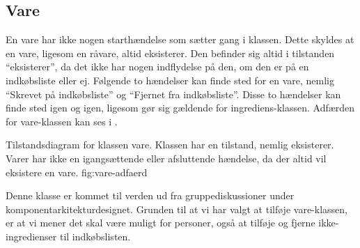\subsection{Vare}
En vare har ikke nogen starthændelse som sætter gang i klassen. Dette skyldes at en vare, ligesom en råvare, altid eksisterer. Den befinder sig altid i tilstanden ``eksisterer'', da det ikke har nogen indflydelse på den, om den er på en indkøbsliste eller ej. Følgende to hændelser kan finde sted for en vare, nemlig ``Skrevet på indkøbsliste'' og ``Fjernet fra indkøbsliste''. Disse to hændelser kan finde sted igen og igen, ligesom gør sig gældende for ingrediens-klassen. Adfærden for vare-klassen kan ses i . 

  {Tilstandsdiagram for klassen vare. Klassen har en tilstand, nemlig eksisterer. Varer har ikke en igangsættende eller afsluttende hændelse, da der altid vil eksistere en vare.}
  {fig:vare-adfaerd}
  
Denne klasse er kommet til verden ud fra gruppediskussioner under komponentarkitekturdesignet. Grunden til at vi har valgt at tilføje vare-klassen, er at vi mener det skal være muligt for personer, også at tilføje og fjerne ikke-ingredienser til indkøbslisten.  
